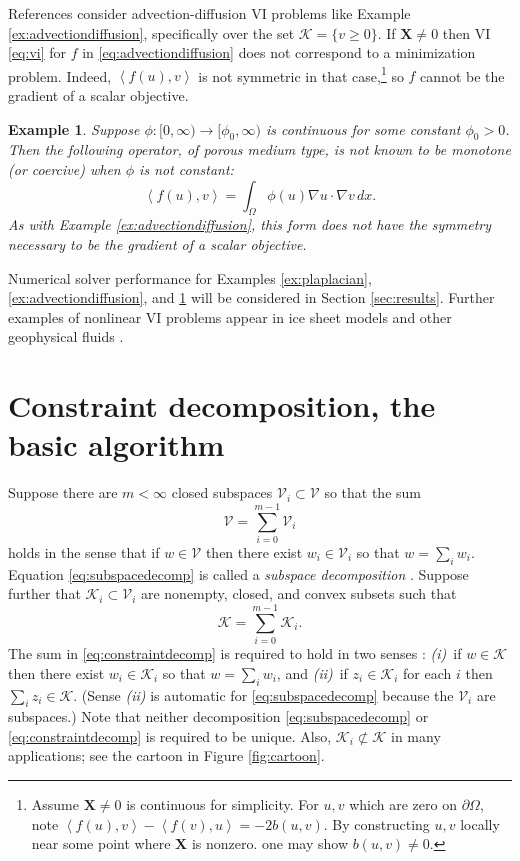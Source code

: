 \documentclass[letterpaper,final,12pt,reqno]{amsart}
\theoremstyle{cstyle}
\theoremstyle{cstyle*}
\theoremstyle{dstyle}
\newtheorem{example}[theorem]{Example}
\numberwithin{equation}{section}
\numberwithin{figure}{section}
\numberwithin{table}{section}
\numberwithin{theorem}{section}
\newcommand{\grad}{\nabla}
\newcommand{\bX}{\mathbf{X}}
\newcommand{\cK}{\mathcal{K}}
\newcommand{\cV}{\mathcal{V}}
\newcommand{\ip}[2]{\left<#1,#2\right>}
\begin{document}
References \cite{Bueler2021conservation,ChangNakshatrala2017} consider advection-diffusion VI problems like Example \ref{ex:advectiondiffusion}, specifically over the set $\cK = \{v\ge 0\}$.  If $\bX \ne 0$ then VI \eqref{eq:vi} for $f$ in \eqref{eq:advectiondiffusion} does not correspond to a minimization problem.  Indeed, $\ip{f(u)}{v}$ is not symmetric in that case,\footnote{Assume $\bX \ne 0$ is continuous for simplicity.  For $u,v$ which are zero on $\partial \Omega$, note $\ip{f(u)}{v} - \ip{f(v)}{u} = -2 b(u,v)$.  By constructing $u,v$ locally near some point where $\bX$ is nonzero. one may show $b(u,v)\ne 0$.} so $f$ cannot be the gradient of a scalar objective.

\begin{example}  \label{ex:porous}  Suppose $\phi:[0,\infty) \to [\phi_0,\infty)$ is continuous for some constant $\phi_0>0$.  Then the following operator, of porous medium type, is not known to be monotone (or coercive) when $\phi$ is not constant:
\begin{equation}
\ip{f(u)}{v} = \int_\Omega \phi(u) \grad u \cdot \grad v\,dx. \label{eq:porous}
\end{equation}
As with Example \ref{ex:advectiondiffusion}, this form does not have the symmetry necessary to be the gradient of a scalar objective.
\end{example}

Numerical solver performance for Examples \ref{ex:plaplacian}, \ref{ex:advectiondiffusion}, and \ref{ex:porous} will be considered in Section \ref{sec:results}.  Further examples of nonlinear VI problems appear in ice sheet models and other geophysical fluids \cite{Bueler2021conservation,Calvoetal2002,JouvetBueler2012}.


\section{Constraint decomposition, the basic algorithm} \label{sec:cd}

Suppose there are $m<\infty$ closed subspaces $\cV_i \subset \cV$ so that the sum
\begin{equation}
\cV = \sum_{i=0}^{m-1} \cV_i \label{eq:subspacedecomp}
\end{equation}
holds in the sense that if $w \in \cV$ then there exist $w_i \in \cV_i$ so that $w = \sum_i w_i$.  Equation \eqref{eq:subspacedecomp} is called a \emph{subspace decomposition} \cite{Xu1992}.  Suppose further that $\cK_i \subset \cV_i$ are nonempty, closed, and convex subsets such that
\begin{equation}
\cK = \sum_{i=0}^{m-1} \cK_i. \label{eq:constraintdecomp}
\end{equation}
The sum in \eqref{eq:constraintdecomp} is required to hold in two senses \cite{TaiTseng2002}: \emph{(i)}~if $w \in \cK$ then there exist $w_i \in \cK_i$ so that $w = \sum_i w_i$, and \emph{(ii)}~if $z_i \in \cK_i$ for each $i$ then $\sum_i z_i \in \cK$.  (Sense \emph{(ii)} is automatic for \eqref{eq:subspacedecomp} because the $\cV_i$ are subspaces.)  Note that neither decomposition \eqref{eq:subspacedecomp} or \eqref{eq:constraintdecomp} is required to be unique.  Also, $\cK_i \not\subset \cK$ in many applications; see the cartoon in Figure \ref{fig:cartoon}.
\end{document}

